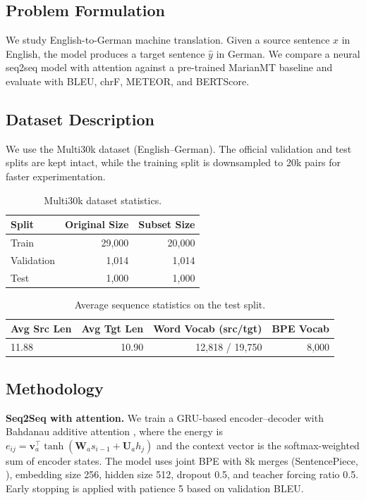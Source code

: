 
\subsection{Problem Formulation}
We study English-to-German machine translation. Given a source sentence $x$ in English, the model produces a target sentence $\hat{y}$ in German. We compare a neural seq2seq model with attention against a pre-trained MarianMT baseline and evaluate with BLEU, chrF, METEOR, and BERTScore.

\subsection{Dataset Description}
We use the Multi30k dataset \citep{Elliott2016multi30k} (English--German). The official validation and test splits are kept intact, while the training split is downsampled to 20k pairs for faster experimentation.

\begin{table}[H]
\centering
\caption{Multi30k dataset statistics.}
\begin{tabular}{lrr}
\toprule
\textbf{Split} & \textbf{Original Size} & \textbf{Subset Size} \\
\midrule
Train & 29,000 & 20,000 \\
Validation & 1,014 & 1,014 \\
Test & 1,000 & 1,000 \\
\bottomrule
\end{tabular}
\end{table}

\begin{table}[H]
\centering
\caption{Average sequence statistics on the test split.}
\begin{tabular}{lrrr}
\toprule
\textbf{Avg Src Len} & \textbf{Avg Tgt Len} & \textbf{Word Vocab (src/tgt)} & \textbf{BPE Vocab} \\
\midrule
11.88 & 10.90 & 12,818 / 19,750 & 8,000 \\
\bottomrule
\end{tabular}
\end{table}

\subsection{Methodology}
\textbf{Seq2Seq with attention.} We train a GRU-based encoder--decoder with Bahdanau additive attention \citep{Bahdanau2015nmt}, where the energy is $e_{ij} = \mathbf{v}_a^{\top} \tanh(\mathbf{W}_a s_{i-1} + \mathbf{U}_a h_j)$ and the context vector is the softmax-weighted sum of encoder states. The model uses joint BPE with 8k merges (SentencePiece, \citealp{Kudo2018sentencepiece}), embedding size 256, hidden size 512, dropout 0.5, and teacher forcing ratio 0.5. Early stopping is applied with patience 5 based on validation BLEU.

